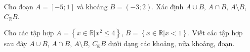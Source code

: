 \begin{bt}%
	Cho đoạn $A=[-5;1]$ và khoảng $B=(-3;2)$. Xác định $A\cup B$, $A\cap B$, $A\setminus B$, $C_{\mathbb{R}}B$.
\loigiai{
	Ta có
	\begin{itemize}
		\item $A\cup B=[-5;2)$.
		\item $A\cap B=(-3;1]$.
		\item $A\setminus B=[-5;-3]$.
		\item $C_{\mathbb{R}}B=\mathbb{R}\setminus B=(-\infty;-3]\cup [2;+\infty)$.
	\end{itemize}
	}
\end{bt}
\begin{bt}%
	Cho các tập hợp $A=\left\{x\in \mathbb{R}\big|x^2\leq 4\right\}$, $B=\left\{x\in \mathbb{R}\big|x<1\right\}$. Viết các tập hợp sau đây $A\cup B$, $A\cap B$, $A\setminus B$, $ C_{\mathbb{R}}B$ dưới dạng các khoảng, nửa khoảng, đoạn.
\loigiai{
	Ta có $A=[-2;2]$ và $B=(-\infty;1)$, suy ra
	\begin{itemize}
		\item $A\cup B=[-2;2]\cup (-\infty;1)=(-\infty;2]$.
		\item $A\cap B=[-2;2]\cap (-\infty;1)=[-2;1)$.
		\item $A\setminus B=[-2;2]\setminus (-\infty;1)=[1;2]$.
		\item $C_{\mathbb{R}}B=[1;+\infty)$.
	\end{itemize}
	}
\end{bt}
